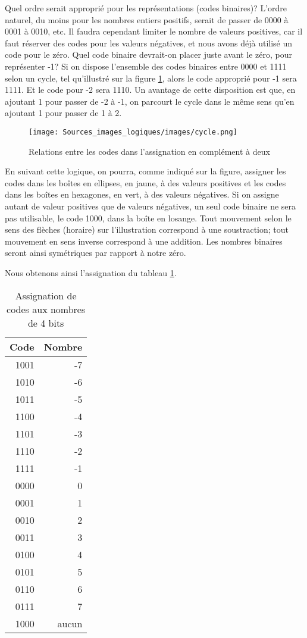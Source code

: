 \documentclass[11pt]{article}
\begin{document}
Quel ordre serait approprié pour les représentations (codes binaires)?
L'ordre naturel, du moins pour les nombres entiers positifs, serait de
passer de 0000 à 0001 à 0010, etc. Il faudra cependant limiter le
nombre de valeurs positives, car il faut réserver des codes pour les
valeurs négatives, et nous avons déjà utilisé un code pour le
zéro. Quel code binaire devrait-on placer juste avant le zéro, pour
représenter -1? Si on dispose l'ensemble des codes binaires entre 0000
et 1111 selon un cycle, tel qu'illustré sur la figure
\ref{fig:orgcef5804}, alors le code approprié pour -1 sera 1111. Et le
code pour -2 sera 1110. Un avantage de cette disposition est que, en
ajoutant 1 pour passer de -2 à -1, on parcourt le cycle dans le même
sens qu'en ajoutant 1 pour passer de 1 à 2.

\begin{figure}[htbp]
\centering
\texttt{[image: Sources\_images\_logiques/images/cycle.png]}
\caption{\label{fig:orgcef5804}Relations entre les codes dans l'assignation en complément à deux}
\end{figure}

En suivant cette logique, on pourra, comme indiqué sur la figure,
assigner les codes dans les boîtes en ellipses, en jaune, à des
valeurs positives et les codes dans les boîtes en hexagones, en vert,
à des valeurs négatives. Si on assigne autant de valeur positives que
de valeurs négatives, un seul code binaire ne sera pas utilisable, le
code 1000, dans la boîte en losange. Tout mouvement selon le sens des
flèches (horaire) sur l'illustration correspond à une soustraction;
tout mouvement en sens inverse correspond à une addition. Les nombres
binaires seront ainsi symétriques par rapport à notre zéro.

Nous obtenons ainsi l'assignation du tableau \ref{tab:orgeb08369}.

\begin{table}[htbp]
\caption{\label{tab:orgeb08369}Assignation de codes aux nombres de 4 bits}
\centering
\begin{tabular}{rr}
Code & Nombre\\
\hline
1001 & -7\\
1010 & -6\\
1011 & -5\\
1100 & -4\\
1101 & -3\\
1110 & -2\\
1111 & -1\\
0000 & 0\\
0001 & 1\\
0010 & 2\\
0011 & 3\\
0100 & 4\\
0101 & 5\\
0110 & 6\\
0111 & 7\\
1000 & aucun\\
\end{tabular}
\end{table}
\end{document}
